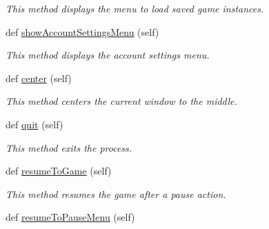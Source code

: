 \begin{DoxyCompactItemize}
\begin{DoxyCompactList}\small\item\em This method displays the menu to load saved game instances. \end{DoxyCompactList}\item 
\hypertarget{classsrc_1_1game_1_1_game_a42b40336207a65cb12910ae7d1a4175d}{}def \hyperlink{classsrc_1_1game_1_1_game_a42b40336207a65cb12910ae7d1a4175d}{show\+Account\+Settings\+Menu} (self)\label{classsrc_1_1game_1_1_game_a42b40336207a65cb12910ae7d1a4175d}

\begin{DoxyCompactList}\small\item\em This method displays the account settings menu. \end{DoxyCompactList}\item 
\hypertarget{classsrc_1_1game_1_1_game_a243a1df9b63a0f081b90fa29146a4af6}{}def \hyperlink{classsrc_1_1game_1_1_game_a243a1df9b63a0f081b90fa29146a4af6}{center} (self)\label{classsrc_1_1game_1_1_game_a243a1df9b63a0f081b90fa29146a4af6}

\begin{DoxyCompactList}\small\item\em This method centers the current window to the middle. \end{DoxyCompactList}\item 
\hypertarget{classsrc_1_1game_1_1_game_aa7856f8d00f279cc139d131cb2e8d8ea}{}def \hyperlink{classsrc_1_1game_1_1_game_aa7856f8d00f279cc139d131cb2e8d8ea}{quit} (self)\label{classsrc_1_1game_1_1_game_aa7856f8d00f279cc139d131cb2e8d8ea}

\begin{DoxyCompactList}\small\item\em This method exits the process. \end{DoxyCompactList}\item 
\hypertarget{classsrc_1_1game_1_1_game_a19d0646df1f0cb57f8262412487d5270}{}def \hyperlink{classsrc_1_1game_1_1_game_a19d0646df1f0cb57f8262412487d5270}{resume\+To\+Game} (self)\label{classsrc_1_1game_1_1_game_a19d0646df1f0cb57f8262412487d5270}

\begin{DoxyCompactList}\small\item\em This method resumes the game after a pause action. \end{DoxyCompactList}\item 
\hypertarget{classsrc_1_1game_1_1_game_add2df3ddda7fa333cadb6fcfa060eaef}{}def \hyperlink{classsrc_1_1game_1_1_game_add2df3ddda7fa333cadb6fcfa060eaef}{resume\+To\+Pause\+Menu} (self)\label{classsrc_1_1game_1_1_game_add2df3ddda7fa333cadb6fcfa060eaef}


\end{DoxyCompactItemize}
